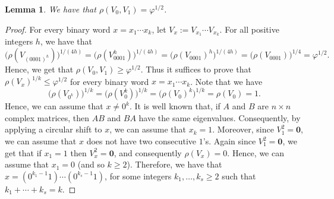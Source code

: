 \documentclass[11pt]{article}
\newtheorem{lemma}[theorem]{Lemma}
\theoremstyle{remark}\newtheorem{remark}[theorem]{Remark}
\begin{document}
\begin{lemma}\label{lem:rho-T0-T1}
	We have that $\rho(V_0, V_1) = \varphi^{1/2}$.
\end{lemma}
\begin{proof}
	For every binary word $x = x_1 \cdots x_k$, let $V_x := V_{x_1} \cdots V_{x_k}$.
	For all positive integers $h$, we have that
	\begin{equation*}
		\big(\rho(V_{(0001)^h})\big)^{1/(4h)} = \big(\rho(V_{0001}^h)\big)^{1/(4h)} = \big(\rho(V_{0001})^h\big)^{1/(4h)} = \big(\rho(V_{0001}))^{1/4} = \varphi^{1/2} .
	\end{equation*}
	Hence, we get that $\rho(V_0, V_1) \geq \varphi^{1/2}$.
	Thus it suffices to prove that $\rho(V_x)^{1/k} \leq \varphi^{1/2}$ for every binary word $x = x_1 \cdots x_k$.
	Note that we have
	\begin{equation*}
		\big(\rho(V_{0^k})\big)^{1/k} = \big(\rho(V_0^k)\big)^{1/k} = \big(\rho(V_0)^k\big)^{1/k} = \rho(V_0) = 1 .
	\end{equation*}
	Hence, we can assume that $x \neq 0^k$.
	It is well known that, if $A$ and $B$ are $n \times n$ complex matrices, then $AB$ and $BA$ have the same eigenvalues.
	Consequently, by applying a circular shift to $x$, we can assume that $x_k = 1$.
	Moreover, since $V_1^2 = \mathbf{0}$, we can assume that $x$ does not have two consecutive $1$'s.
	Again since $V_1^2 = \mathbf{0}$, we get that if $x_1 = 1$ then $V_x^2 = \mathbf{0}$, and consequently $\rho(V_x) = 0$.
	Hence, we can assume that $x_1 = 0$ (and so $k \geq 2$).
	Therefore, we have that $x = (0^{k_1 - 1}1) \cdots (0^{k_s - 1}1)$, for some integers $k_1, \dots, k_s \geq 2$ such that $k_1 + \cdots + k_s = k$.
	

\end{proof}
\end{document}
